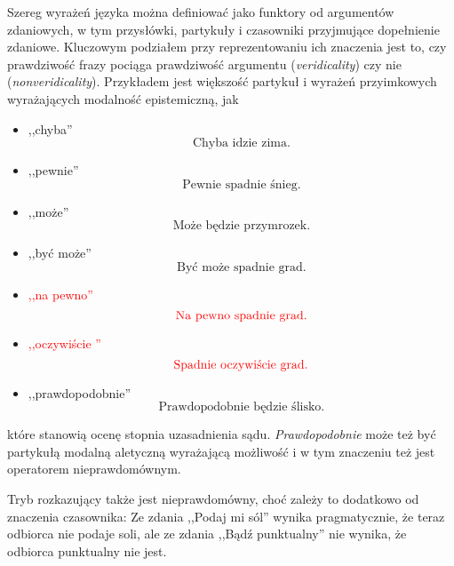 \documentclass[a4paper, 12pt]{article}
\theoremstyle{remark}
\begin{document}
Szereg wyrażeń języka można definiować jako funktory od argumentów zdaniowych, w tym przysłówki, partykuły i czasowniki przyjmujące dopełnienie zdaniowe. Kluczowym podziałem przy reprezentowaniu ich znaczenia jest to, czy prawdziwość frazy pociąga prawdziwość argumentu (\emph{veridicality}) czy nie (\emph{nonveridicality}).
Przykładem jest większość partykuł i wyrażeń przyimkowych wyrażających modalność epistemiczną, jak
\begin{itemize}
\item ,,chyba''
\begin{equation}
	\text{Chyba idzie zima.}
\end{equation}
\item ,,pewnie''
\begin{equation}
	\text{Pewnie spadnie śnieg.}
\end{equation}
\item ,,może''
\begin{equation}
	\text{Może będzie przymrozek.}
\end{equation}
\item ,,być może''
\begin{equation}
	\text{Być może spadnie grad.}
\end{equation}
\item \textcolor{red}{,,na pewno''}
\begin{equation}
	\text{\textcolor{red}{Na pewno spadnie grad.}}
\end{equation}
\item \textcolor{red}{,,oczywiście ''}
\begin{equation}
	\text{\textcolor{red}{Spadnie oczywiście grad.}}
\end{equation}
\item ,,prawdopodobnie''
\begin{equation}
	\text{Prawdopodobnie będzie ślisko.}
\end{equation}
\end{itemize}
które stanowią ocenę stopnia uzasadnienia sądu. \emph{Prawdopodobnie} może też być partykułą modalną aletyczną wyrażającą możliwość i w tym znaczeniu też jest operatorem nieprawdomównym.

Tryb rozkazujący także jest nieprawdomówny, choć zależy to dodatkowo od znaczenia czasownika: Ze zdania ,,Podaj mi sól'' wynika pragmatycznie, że teraz odbiorca nie podaje soli, ale ze zdania ,,Bądź punktualny'' nie wynika, że odbiorca punktualny nie jest.
\end{document}
